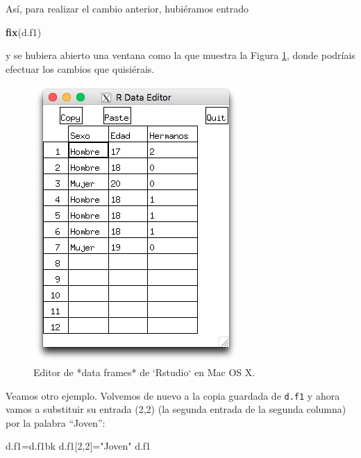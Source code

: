 \documentclass[]{book}
\newenvironment{Shaded}{\begin{snugshade}}{\end{snugshade}}
\newcommand{\DecValTok}[1]{\textcolor[rgb]{0.00,0.00,0.81}{#1}}
\newcommand{\KeywordTok}[1]{\textcolor[rgb]{0.13,0.29,0.53}{\textbf{#1}}}
\newcommand{\NormalTok}[1]{#1}
\newcommand{\StringTok}[1]{\textcolor[rgb]{0.31,0.60,0.02}{#1}}
\theoremstyle{definition}
\theoremstyle{definition}
\theoremstyle{definition}
\theoremstyle{remark}
\begin{document}
Así, para realizar el cambio anterior, hubiéramos entrado

\begin{Shaded}
\begin{Highlighting}[]
\KeywordTok{fix}\NormalTok{(d.f1)}
\end{Highlighting}
\end{Shaded}

y se hubiera abierto una ventana como la que muestra la Figura \ref{fig:edit}, donde podríais efectuar los cambios que quisiérais.

\begin{figure}

{\centering \includegraphics{AprendeR-Parte-I_files/figure-html/dataeditordf2} 

}

\caption{Editor de *data frames*  de `Rstudio` en  Mac OS X.}\label{fig:edit}
\end{figure}

Veamos otro ejemplo. Volvemos de nuevo a la copia guardada de \texttt{d.f1} y ahora vamos a substituir su entrada (2,2) (la segunda entrada de la segunda columna) por la palabra ``Joven'':

\begin{Shaded}
\begin{Highlighting}[]
\NormalTok{d.f1=d.f1bk }
\NormalTok{d.f1[}\DecValTok{2}\NormalTok{,}\DecValTok{2}\NormalTok{]=}\StringTok{"Joven"} 
\NormalTok{d.f1}
\end{Highlighting}
\end{Shaded}
\end{document}
